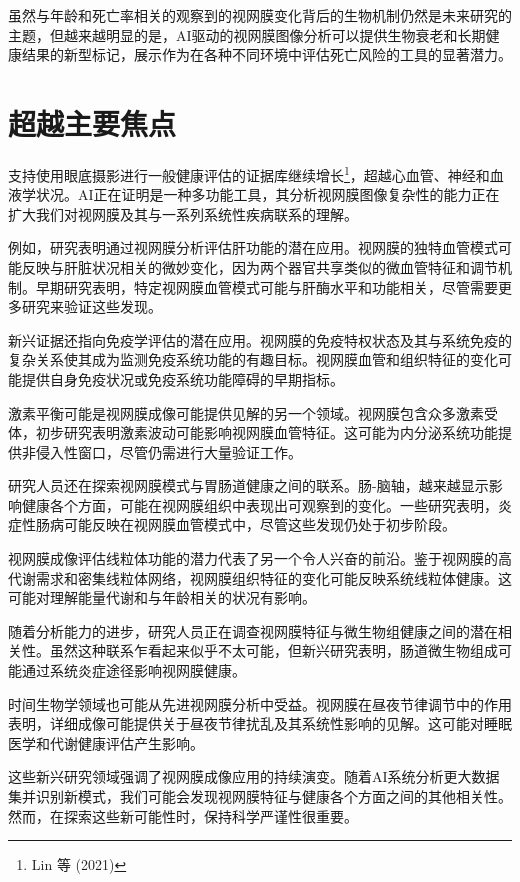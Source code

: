 \documentclass[
  Letterpaper,
]{scrbook}
\begin{document}
虽然与年龄和死亡率相关的观察到的视网膜变化背后的生物机制仍然是未来研究的主题，但越来越明显的是，AI驱动的视网膜图像分析可以提供生物衰老和长期健康结果的新型标记，展示作为在各种不同环境中评估死亡风险的工具的显著潜力。

\section{超越主要焦点}\label{ux8d85ux8d8aux4e3bux8981ux7126ux70b9}

支持使用眼底摄影进行一般健康评估的证据库继续增长\footnote{Lin 等 (2021)}，超越心血管、神经和血液学状况。AI正在证明是一种多功能工具，其分析视网膜图像复杂性的能力正在扩大我们对视网膜及其与一系列系统性疾病联系的理解。

例如，研究表明通过视网膜分析评估肝功能的潜在应用。视网膜的独特血管模式可能反映与肝脏状况相关的微妙变化，因为两个器官共享类似的微血管特征和调节机制。早期研究表明，特定视网膜血管模式可能与肝酶水平和功能相关，尽管需要更多研究来验证这些发现。

新兴证据还指向免疫学评估的潜在应用。视网膜的免疫特权状态及其与系统免疫的复杂关系使其成为监测免疫系统功能的有趣目标。视网膜血管和组织特征的变化可能提供自身免疫状况或免疫系统功能障碍的早期指标。

激素平衡可能是视网膜成像可能提供见解的另一个领域。视网膜包含众多激素受体，初步研究表明激素波动可能影响视网膜血管特征。这可能为内分泌系统功能提供非侵入性窗口，尽管仍需进行大量验证工作。

研究人员还在探索视网膜模式与胃肠道健康之间的联系。肠-脑轴，越来越显示影响健康各个方面，可能在视网膜组织中表现出可观察到的变化。一些研究表明，炎症性肠病可能反映在视网膜血管模式中，尽管这些发现仍处于初步阶段。

视网膜成像评估线粒体功能的潜力代表了另一个令人兴奋的前沿。鉴于视网膜的高代谢需求和密集线粒体网络，视网膜组织特征的变化可能反映系统线粒体健康。这可能对理解能量代谢和与年龄相关的状况有影响。

随着分析能力的进步，研究人员正在调查视网膜特征与微生物组健康之间的潜在相关性。虽然这种联系乍看起来似乎不太可能，但新兴研究表明，肠道微生物组成可能通过系统炎症途径影响视网膜健康。

时间生物学领域也可能从先进视网膜分析中受益。视网膜在昼夜节律调节中的作用表明，详细成像可能提供关于昼夜节律扰乱及其系统性影响的见解。这可能对睡眠医学和代谢健康评估产生影响。

这些新兴研究领域强调了视网膜成像应用的持续演变。随着AI系统分析更大数据集并识别新模式，我们可能会发现视网膜特征与健康各个方面之间的其他相关性。然而，在探索这些新可能性时，保持科学严谨性很重要。
\end{document}
